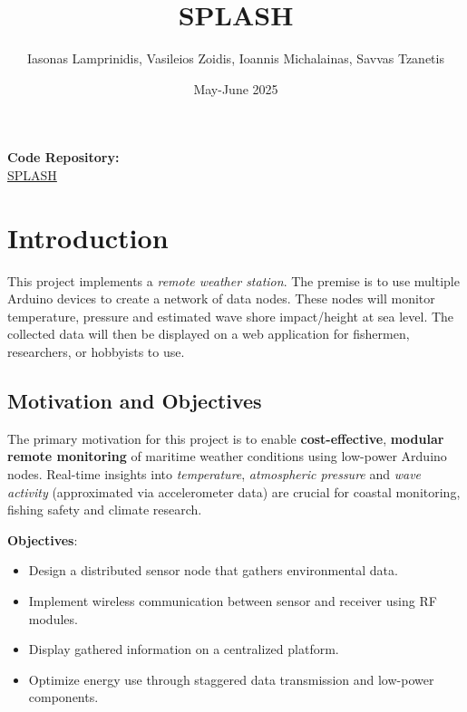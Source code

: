\documentclass{article}
\title{SPLASH}
\author{Iasonas Lamprinidis, Vasileios Zoidis, Ioannis Michalainas, Savvas Tzanetis}
\date{May-June 2025}
\begin{document}
\maketitle
\begin{center}
  \textbf{Code Repository:} \\
  \href{https://github.com/ioannisam/SPLASH}{SPLASH}
\end{center}
\bigskip
\begin{abstract}
\end{abstract}
\tableofcontents
\clearpage

\section{Introduction}
This project implements a \textit{remote weather station}. The premise is to use multiple Arduino devices to create a network of data nodes. These nodes will monitor temperature, pressure and estimated wave shore impact/height at sea level. The collected data will then be displayed on a web application for fishermen, researchers, or hobbyists to use.
    
    \subsection{Motivation and Objectives}

    The primary motivation for this project is to enable \textbf{cost-effective}, \textbf{modular} \textbf{remote monitoring} of maritime weather conditions using low-power Arduino nodes. Real-time insights into \textit{temperature}, \textit{atmospheric pressure} and \textit{wave activity} (approximated via accelerometer data) are crucial for coastal monitoring, fishing safety and climate research.
    
    \vspace{0.5cm}
    \textbf{Objectives}:
    \begin{itemize}
        \item Design a distributed sensor node that gathers environmental data.
        \item Implement wireless communication between sensor and receiver using RF modules.
        \item Display gathered information on a centralized platform.
        \item Optimize energy use through staggered data transmission and low-power components.
    \end{itemize}
    
\end{document}

